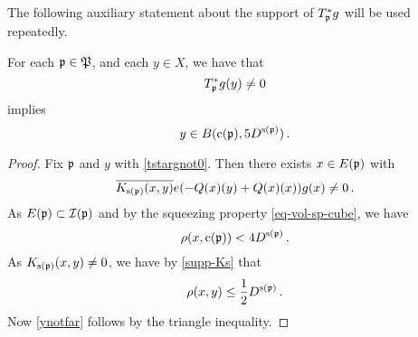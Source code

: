 The following auxiliary statement about the support of $T_{\mathfrak p}^*g$ will be
used repeatedly.

\begin{lemma}\label{tile-range-support}
    \leanok
        For each ${\mathfrak p}\in {\mathfrak P}$, and each $y\in X$, we have that
    \begin{equation}\label{tstargnot0}
         T_{{\mathfrak p}}^* g(y)\neq 0
    \end{equation}
       implies
    \begin{equation}\label{ynotfar}
        y\in B({\mathrm{c}}({\mathfrak p}),5D^{{\mathrm{s}}({\mathfrak p})})\, .
    \end{equation}
    \end{lemma}
    \begin{proof}
    \leanok
    Fix ${\mathfrak p}$ and $y$ with \eqref{tstargnot0}.
    Then there exists $x\in E({\mathfrak p})$ with
    \begin{equation}
       \overline{K_{{\mathrm{s}}({\mathfrak p})}(x,y)}e(-{Q}(x)(y)
        +{Q}(x)(x))g(x) \neq 0\, .
    \end{equation}
    As $E({\mathfrak p})\subset {\mathcal{I}}({\mathfrak p})$ and by the squeezing property
    \eqref{eq-vol-sp-cube}, we have
    \begin{equation}
        \rho(x,{\mathrm{c}}({\mathfrak p})) < 4D^{{\mathrm{s}}({\mathfrak p})}\, .
    \end{equation}
    As $K_{{\mathrm{s}}({\mathfrak p})}(x,y)\neq 0$, we have by \eqref{supp-Ks}
    that
    \begin{equation}
    \rho(x,y)\le \frac 12 D^{{\mathrm{s}}({\mathfrak p})}\, .
    \end{equation}
    Now \eqref{ynotfar} follows by the triangle inequality.
\end{proof}


